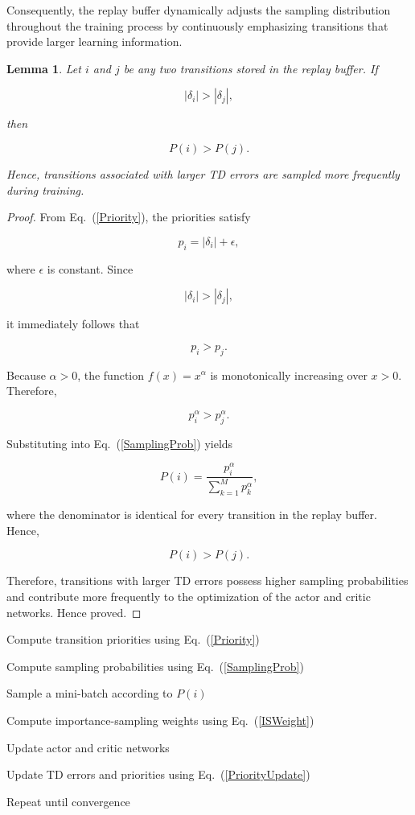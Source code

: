 \documentclass[10pt,journal,compsoc]{IEEEtran}
\newtheorem{lemma}{Lemma}
\begin{document}
Consequently, the replay buffer dynamically adjusts the sampling distribution throughout the training process by continuously emphasizing transitions that provide larger learning information.

\begin{lemma}
Let $i$ and $j$ be any two transitions stored in the replay buffer. If

\begin{equation}
|\delta_i|>|\delta_j|,
\end{equation}

then

\begin{equation}
P(i)>P(j).
\end{equation}

Hence, transitions associated with larger TD errors are sampled more frequently during training.
\end{lemma}

\begin{proof}
From Eq.~(\ref{Priority}), the priorities satisfy

\begin{equation}
p_i=|\delta_i|+\epsilon,
\end{equation}

where $\epsilon$ is constant. Since

\[
|\delta_i|>|\delta_j|,
\]

it immediately follows that

\[
p_i>p_j.
\]

Because $\alpha>0$, the function $f(x)=x^\alpha$ is monotonically increasing over $x>0$. Therefore,

\[
p_i^\alpha>p_j^\alpha.
\]

Substituting into Eq.~(\ref{SamplingProb}) yields

\[
P(i)=
\frac{p_i^\alpha}
{\sum_{k=1}^{M}p_k^\alpha},
\]

where the denominator is identical for every transition in the replay buffer. Hence,

\[
P(i)>P(j).
\]

Therefore, transitions with larger TD errors possess higher sampling probabilities and contribute more frequently to the optimization of the actor and critic networks. Hence proved.
\end{proof}

\begin{algorithm}[t]
\caption{Prioritized Experience Replay}
\label{PERAlgo}

Compute transition priorities using Eq.~(\ref{Priority})\;

Compute sampling probabilities using Eq.~(\ref{SamplingProb})\;

Sample a mini-batch according to $P(i)$\;

Compute importance-sampling weights using Eq.~(\ref{ISWeight})\;

Update actor and critic networks\;

Update TD errors and priorities using Eq.~(\ref{PriorityUpdate})\;

Repeat until convergence\;

\end{algorithm}
\end{document}
